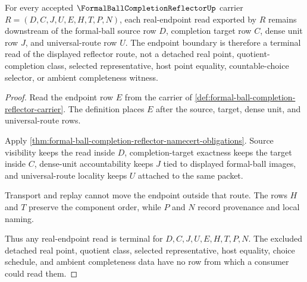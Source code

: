 \begin{theorem}\label{thm:formal-ball-completion-reflector-real-endpoint-boundary}
For every accepted $\FormalBallCompletionReflectorUp$ carrier $R=(D,C,J,U,E,H,T,P,N)$, each real-endpoint read exported by $R$ remains downstream of the formal-ball source row $D$, completion target row $C$, dense unit row $J$, and universal-route row $U$. The endpoint boundary is therefore a terminal read of the displayed reflector route, not a detached real point, quotient-completion class, selected representative, host point equality, countable-choice selector, or ambient completeness witness.
\end{theorem}
\begin{proof}
Read the endpoint row $E$ from the carrier of \autoref{def:formal-ball-completion-reflector-carrier}. The definition places $E$ after the source, target, dense unit, and universal-route rows.

Apply \autoref{thm:formal-ball-completion-reflector-namecert-obligations}. Source visibility keeps the read inside $D$, completion-target exactness keeps the target inside $C$, dense-unit accountability keeps $J$ tied to displayed formal-ball images, and universal-route locality keeps $U$ attached to the same packet.

Transport and replay cannot move the endpoint outside that route. The rows $H$ and $T$ preserve the component order, while $P$ and $N$ record provenance and local naming.

Thus any real-endpoint read is terminal for $D,C,J,U,E,H,T,P,N$. The excluded detached real point, quotient class, selected representative, host equality, choice schedule, and ambient completeness data have no row from which a consumer could read them.
\end{proof}



